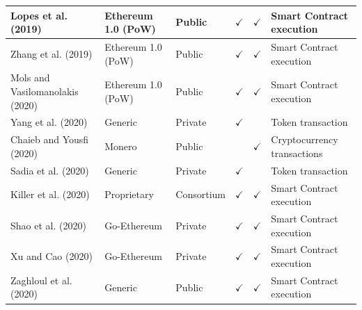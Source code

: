 \documentclass[../access.tex]{subfiles}
\begin{document}
\begin{table}[htbp]
\begin{adjustwidth}{-1cm}{}
\begin{tabular}{m{4.4cm} >{\centering\arraybackslash}m{2.9cm} >{\centering\arraybackslash}m{1.0cm} >{\centering\arraybackslash}m{1.0cm} >{\centering\arraybackslash}m{1.5cm} >{\centering\arraybackslash}m{3.6cm}}
                    \hline
                    \footnotesize{Lopes et al. (2019) \cite{Lopes2019}} & \footnotesize{Ethereum 1.0 (PoW)} & \footnotesize{Public} & $ \checkmark $ & $ \checkmark $ & \footnotesize{Smart Contract execution} \\
                    \hline
                    \footnotesize{Zhang et al. (2019) \cite{Zhang2019a}} & \footnotesize{Ethereum 1.0 (PoW)} & \footnotesize{Public} & $ \checkmark $ & $ \checkmark $ & \footnotesize{Smart Contract execution} \\
                    \hline
                    \footnotesize{Mols and Vasilomanolakis (2020) \cite{Mols2020}} & \footnotesize{Ethereum 1.0 (PoW)} & \footnotesize{Public} & $ \checkmark $ & $ \checkmark $ & \footnotesize{Smart Contract execution} \\
                    \hline
                    \footnotesize{Yang et al. (2020) \cite{Yang2020}} & \footnotesize{Generic} & \footnotesize{Private} & $ \checkmark $ & {} & \footnotesize{Token transaction} \\
                    \hline
                    \footnotesize{Chaieb and Yousfi (2020) \cite{Chaieb2020}} & \footnotesize{Monero} & \footnotesize{Public} & {} & $ \checkmark $ & \footnotesize{Cryptocurrency transactions} \\
                    \hline
                    \footnotesize{Sadia et al. (2020) \cite{Sadia2020}} & \footnotesize{Generic} & \footnotesize{Private} & $ \checkmark $ & {} & \footnotesize{Token transaction} \\
                    \hline
                    \footnotesize{Killer et al. (2020) \cite{Killer2020}} & \footnotesize{Proprietary} & \footnotesize{Consortium} & $ \checkmark $ & $ \checkmark $ & \footnotesize{Smart Contract execution} \\
                    \hline
                    \footnotesize{Shao et al. (2020) \cite{Shao2020}} & \footnotesize{Go-Ethereum} & \footnotesize{Private} & $ \checkmark $ & $ \checkmark $ & \footnotesize{Smart Contract execution} \\
                    \hline
                    \footnotesize{Xu and Cao (2020) \cite{Xu2020}} & \footnotesize{Go-Ethereum} & \footnotesize{Private} & $ \checkmark $ & $ \checkmark $ & \footnotesize{Smart Contract execution} \\
                    \hline
                    \footnotesize{Zaghloul et al. (2020) \cite{Zaghloul2020}} & \footnotesize{Generic} & \footnotesize{Public} & $ \checkmark $ & $ \checkmark $ & \footnotesize{Smart Contract execution} \\

\end{tabular}
\end{adjustwidth}
\end{table}
\end{document}
